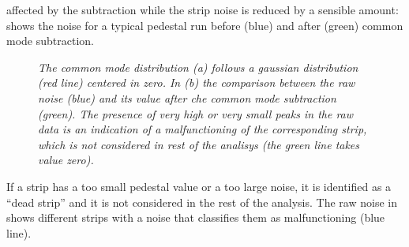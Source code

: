 affected by the subtraction while the strip noise is reduced by a
sensible amount:  shows the noise for a typical pedestal run before
(blue) and after (green) common mode subtraction.\\
\begin{figure}[!htbp]
  \centering 
  \quad
  \caption{\it The common mode distribution (a) follows a gaussian distribution
    (red line) centered in zero. In (b) the comparison between the raw noise
    (blue) and its value after che common mode subtraction (green). The presence
    of very high or very small peaks in the raw data is an indication of a
    malfunctioning of the corresponding strip, which is not considered in rest
    of the analisys (the green line takes value zero).
  }\label{fig:cm-sub}
\end{figure}
If a strip has a too small pedestal value or a too large noise, it is identified
as a ``dead strip'' and it is not considered in the rest of the
analysis. The raw noise in  shows different
strips with a noise that classifies them as malfunctioning (blue line).

